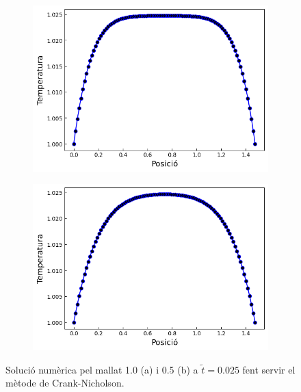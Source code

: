 \documentclass{article}
\begin{document}
\begin{figure}[h]
    \centering
    \begin{subfigure}[b]{0.35\textwidth}
        \includegraphics[width=\textwidth]{images/T_vs_z_CN_at1.png} 
        \caption{}
        \label{fig:CN_at1}
    \end{subfigure}
    \hspace{1.5cm}
    \begin{subfigure}[b]{0.35\textwidth}
        \includegraphics[width=\textwidth]{images/T_vs_z_CN_at2.png}
        \caption{} 
        \label{fig:CN_at2}
    \end{subfigure}
    \caption{Solució numèrica pel mallat 1.0 (a) i 0.5 (b) a $\tilde{t}=0.025$ fent servir el mètode de Crank-Nicholson.}
    \label{fig:crank_nicholson}
\end{figure}
\end{document}

